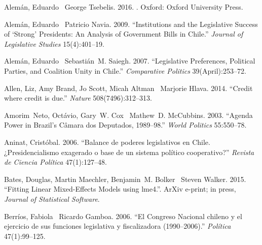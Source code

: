 \documentclass[letter,12pt]{article}
\begin{document}
\begin{thebibliography}{xx}

Alem\'an, Eduardo \harvardand\ George Tsebelis. 2016.
.
\newblock Oxford:  Oxford University Press.

Alem\'an, Eduardo \harvardand\ Patricio Navia. 2009.
\newblock ``Institutions and the Legislative Success of `Strong' Presidents: An
  Analysis of Government Bills in {Chile}.'' {\em Journal of Legislative
  Studies} 15(4):401--19.

Alem\'an, Eduardo \harvardand\ Sebasti\'an~M. Saiegh. 2007.
\newblock ``Legislative Preferences, Political Parties, and Coalition Unity in
  Chile.'' {\em Comparative Politics} 39(April):253--72.

Allen, Liz, Amy Brand, Jo Scott, Micah Altman \harvardand\ Marjorie Hlava.
  2014.
\newblock ``Credit where credit is due.'' {\em Nature} 508(7496):312--313.

Amorim~Neto, Oct\'avio, Gary~W. Cox \harvardand\ Mathew~D. McCubbins. 2003.
\newblock ``Agenda Power in Brazil's C\^amara dos Deputados, 1989--98.'' {\em
  World Politics} 55:550--78.

Aninat, Crist\'obal. 2006.
\newblock ``Balance de poderes legislativos en Chile. ¿Presidencialismo
  exagerado o base de un sistema pol\'itico cooperativo?'' {\em Revista de
  Ciencia Pol\'itica} 47(1):127--48.

Bates, Douglas, Martin Maechler, Benjamin~M. Bolker \harvardand\ Steven Walker.
  2015.
\newblock ``Fitting Linear Mixed-Effects Models using {lme4}.''.
\newblock ArXiv e-print; in press, \emph{Journal of Statistical Software}.
\newline{}

Berr\'ios, Fabiola \harvardand\ Ricardo Gamboa. 2006.
\newblock ``El {Congreso Nacional} chileno y el ejercicio de sus funciones
  legislativa y fiscalizadora (1990--2006).'' {\em Pol\'itica} 47(1):99--125.


\end{thebibliography}
\end{document}
